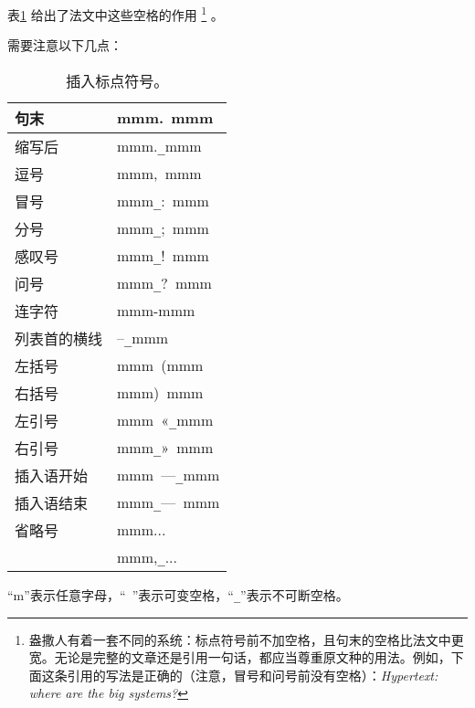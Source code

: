 表\ref{tab1} 给出了法文中这些空格的作用
    \footnote{盎撒人有着一套不同的系统：标点符号前不加空格，且句末的空格比法文中更宽。无论是完整的文章还是引用一句话，都应当尊重原文种的用法。例如，下面这条引用的写法是正确的（注意，冒号和问号前没有空格）：\emph{Hypertext: where are the big systems?}}
。

需要注意以下几点：

\begin{table}
    \begin{center}
        \begin{tabular}{|l|l|}
            \hline
            句末 & mmm.\verb*| |mmm\\
            \hline
            缩写后 & mmm.\verb|_|mmm\\
            \hline
            逗号 & mmm,\verb*| |mmm\\
            \hline
            冒号 & mmm\verb|_|:\verb*| |mmm\\
            \hline
            分号 & mmm\verb|_|;\verb*| |mmm\\
            \hline
            感叹号 & mmm\verb|_|!\verb*| |mmm\\
            \hline
            问号 & mmm\verb|_|?\verb*| |mmm\\
            \hline
            连字符 & mmm-mmm\\
            \hline
            列表首的横线 & --\verb|_|mmm\\
            \hline
            左括号 & mmm\verb*| |(mmm\\
            右括号 & mmm)\verb*| |mmm\\
            \hline
            左引号 & mmm\verb*| |«\verb|_|mmm\\
            右引号 & mmm\verb|_|»\verb*| |mmm\\
            \hline
            插入语开始 & mmm\verb*| |---\verb|_|mmm\\
            插入语结束 & mmm\verb|_|---\verb*| |mmm\\
            \hline
            省略号 & mmm...\\
            & mmm,\verb|_|...\\
            \hline
        \end{tabular}
        \caption{插入标点符号。}
        \label{tab1}
        “m”表示任意字母，“\verb*| |”表示可变空格，“\verb|_|”表示不可断空格。
    \end{center}
\end{table}

